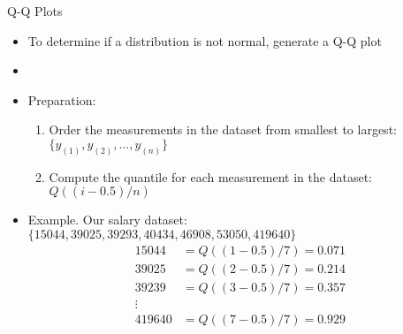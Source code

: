 \documentclass[xcolor=dvipsnames]{beamer}
\begin{document}
\begin{frame}{Q-Q Plots}
	\begin{itemize}
		\item To determine if a distribution is not normal, generate a Q-Q plot
		\item[]
		\item Preparation:
		\begin{enumerate}
			\item Order the measurements in the dataset from smallest to largest: $\{y_{(1)}, y_{(2)}, \hdots, y_{(n)} \}$
			\item Compute the quantile for each measurement in the dataset: $Q((i-0.5) /n)$
		\end{enumerate}
	\item Example. Our salary dataset: $\{15044, 39025, 39293, 40434, 46908, 53050, 419640\}$
	\begin{align*}
		15044 &= Q((1-0.5)/7) = 0.071 \\
		39025 &= Q((2-0.5)/7) = 0.214 \\
		39239 &= Q((3-0.5)/7) = 0.357 \\
		\vdots & \\
		419640 &= Q((7-0.5)/7) = 0.929
	\end{align*}
	\end{itemize}
\end{frame}
\end{document}
